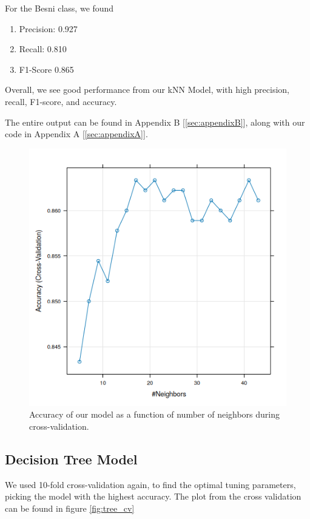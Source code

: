 \documentclass{article}
\begin{document}
For the Besni class, we found

\begin{enumerate}
    \item Precision: 0.927

    \item Recall: 0.810

    \item F1-Score 0.865

\end{enumerate}

Overall, we see good performance from our kNN Model, with high precision, recall, F1-score, and accuracy.

The entire output can be found in Appendix B [\ref{sec:appendixB}], along with our code in Appendix A [\ref{sec:appendixA}].

\begin{figure}
	\centering
	\includegraphics[width=\linewidth]{cv_plot}
	\caption{ Accuracy of our model as a function of number of neighbors during cross-validation.}
	\label{fig:cvPlot}
\end{figure}
\clearpage

\subsection*{Decision Tree Model}
We used 10-fold cross-validation again, to find the optimal tuning parameters, picking the model with the highest accuracy. The plot from the cross validation can be found in figure \ref{fig:tree_cv}
\end{document}
